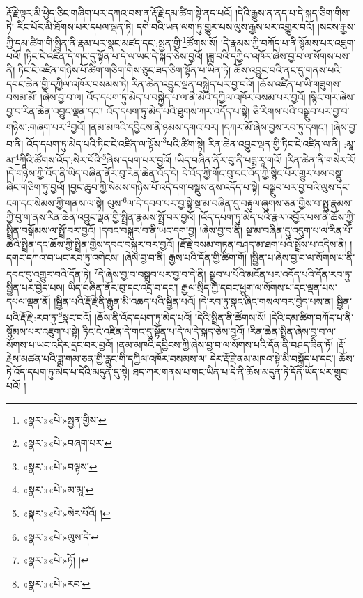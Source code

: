 རྡོ་རྗེ་ལྟར་མི་ཕྱེད་ཅིང་གཞིག་པར་དཀའ་བས་ན་རྡོ་རྗེ་དམ་ཚིག་སྟེ་ནད་པའོ། །དེའི་རྒྱུས་ན་ནད་པ་དེ་སྐད་ཅིག་གིས་ཏེ། རིང་པོར་མི་ཐོགས་པར་དཔལ་ལྡན་ཏེ། དགེ་བའི་ཡན་ལག་ཏུ་གྱུར་པས་ལུས་རྒྱས་པར་འགྱུར་བའོ། །སངས་རྒྱས་ཀྱི་དམ་ཚིག་གི་སྤྲིན་ནི་རྣམ་པར་སྣང་མཛད་དང་:སྤྱན་གྱི་\footnote{«སྣར་»«པེ་»སྤྱན་གྱིས་}ཚོགས་སོ། །དེ་རྣམས་ཀྱི་བཀོད་པ་ནི་སྙོམས་པར་འཇུག་པའོ། །ཏིང་ངེ་འཛིན་དེ་གང་དུ་སྟོན་པ་དེ་ལ་ཡང་དེ་སྐད་ཅེས་བྱའོ། །ཟླ་བའི་དཀྱིལ་འཁོར་ཞེས་བྱ་བ་ལ་སོགས་པས་ནི། ཏིང་ངེ་འཛིན་གཉིས་པོ་ཚིག་གཅིག་གིས་ཅུང་ཟད་ཅིག་སྟོན་པ་ཡིན་ཏེ། ཆོས་འབྱུང་བའི་ནང་དུ་གནས་པའི་དབང་ཆེན་གྱི་དཀྱིལ་འཁོར་བསམས་ཏེ། རིན་ཆེན་འབྱུང་ལྡན་བསྐྱེད་པར་བྱ་བའོ། །ཆོས་འཛིན་པ་ཡི་གཟུགས་བསམ་མོ། །ཞེས་བྱ་བ་ལ། འོད་དཔག་ཏུ་མེད་པ་བསྐྱེད་པ་ལ་ནི་མེའི་དཀྱིལ་འཁོར་བསམ་པར་བྱའོ། །སྙིང་གར་ཞེས་བྱ་བ་རིན་ཆེན་འབྱུང་ལྡན་དང་། འོད་དཔག་ཏུ་མེད་པའི་ཐུགས་ཀར་འདོད་པ་སྟེ། ཅི་རིགས་པའི་བསྒྲུབ་པར་བྱ་བ་གཉིས་:གཞག་པར་\footnote{«སྣར་»«པེ་»བཞག་པར་}བྱའོ། །ནམ་མཁའི་དབྱིངས་ནི་ཉམས་དགའ་བར། །དཀར་མོ་ཞེས་བྱས་རབ་ཏུ་དགང་། །ཞེས་བྱ་བ་ནི། འོད་དཔག་ཏུ་མེད་པའི་ཏིང་ངེ་འཛིན་ལ་ལྟོས་\footnote{«སྣར་»«པེ་»བལྟས་}པའི་ཚིག་སྟེ། རིན་ཆེན་འབྱུང་ལྡན་གྱི་ཏིང་ངེ་འཛིན་ལ་ནི། :མཱ་མ་\footnote{«སྣར་»«པེ་»མ་མཱ་}ཀཱིའི་ཚོགས་འོད་:སེར་པོའི་\footnote{«སྣར་»«པེ་»སེར་པོའོ། །}ཞེས་དཔག་པར་བྱའོ། །ཡིད་བཞིན་ནོར་བུ་ནི་པདྨ་རཱ་གའོ། །རིན་ཆེན་ནི་གསེར་རོ། །དེ་གཉིས་ཀྱི་འོད་ནི་ཡིད་བཞིན་ནོར་བུ་རིན་ཆེན་འོད་དེ། དེ་འོད་ཀྱི་གོང་བུ་དང་འོད་ཀྱི་སྙིང་པོར་གྱུར་པས་བསྡུ་ཞིང་གཅིག་ཏུ་བྱའོ། །བྱང་ཆུབ་ཀྱི་སེམས་གཉིས་པོ་འདི་དག་བསྡུས་ནས་འདོད་པ་སྟེ། བསྒྲུབ་པར་བྱ་བའི་ལུས་དང་ངག་དང་སེམས་ཀྱི་གནས་ལ་སྟེ། ལུས་\footnote{«སྣར་»«པེ་»ལུས་དེ་}ལ་དེ་དབབ་པར་བྱ་སྟེ་སྔ་མ་བཞིན་དུ་བརྟུལ་ཞུགས་ཅན་གྱིས་བ་སྤུ་རྣམས་ཀྱི་བུ་ག་ནས་རིན་ཆེན་འབྱུང་ལྡན་གྱི་སྤྲིན་རྣམས་སྤྲོ་བར་བྱའོ། །འོད་དཔག་ཏུ་མེད་པའི་རྣལ་འབྱོར་པས་ནི་ཆོས་ཀྱི་སྤྲིན་བསྒོམས་ལ་སྤྲོ་བར་བྱའོ། །དབང་བསྐུར་བ་ནི་ཡང་དག་བྱ། །ཞེས་བྱ་བ་ནི། སྔ་མ་བཞིན་དུ་འདུག་པ་ལ་རིན་པོ་ཆེའི་སྤྲིན་དང་ཆོས་ཀྱི་སྤྲིན་གྱིས་དབང་བསྐུར་བར་བྱའོ། །རྡོ་རྗེ་བསམ་གཏན་བཤད་མ་ཐག་པའི་སྤྲོས་པ་འདིས་ནི། །དགང་དཀའ་བ་ཡང་རབ་ཏུ་འགེངས། །ཞེས་བྱ་བ་ནི། རྒྱས་པའི་དོན་གྱི་ཚིག་གོ། །སྦྱིན་པ་ཞེས་བྱ་བ་ལ་སོགས་པ་ནི་དབང་དུ་འགྱུར་བའི་དོན་ཏེ། \footnote{«སྣར་»«པེ་»ཏོ། ། }དེ་ཞེས་བྱ་བ་བསྒྲུབ་པར་བྱ་བ་དེ་ནི། སྒྲུབ་པ་པོའི་མངོན་པར་འདོད་པའི་དོན་རབ་ཏུ་སྦྱིན་པར་བྱེད་པས། ཡིད་བཞིན་ནོར་བུ་དང་འདྲ་བ་དང་། རྒྱལ་སྲིད་ཀྱི་དབང་ཕྱུག་ལ་སོགས་པ་དང་ལྡན་པས་དཔལ་ལྡན་ནོ། །སྦྱིན་པའི་རྡོ་རྗེ་ནི་རྒྱུན་མི་འཆད་པའི་སྦྱིན་པའོ། །དེ་རབ་ཏུ་སྣང་ཞིང་གསལ་བར་བྱེད་པས་ན། སྦྱིན་པའི་རྡོ་རྗེ་:རབ་ཏུ་\footnote{«སྣར་»«པེ་»རབ་}སྣང་བའོ། །ཆོས་ནི་འོད་དཔག་ཏུ་མེད་པའོ། །དེའི་སྤྲིན་ནི་ཚོགས་སོ། །དེའི་དམ་ཚིག་བཀོད་པ་ནི་སྙོམས་པར་འཇུག་པ་སྟེ། ཏིང་ངེ་འཛིན་དེ་གང་དུ་སྟོན་པ་དེ་ལ་དེ་སྐད་ཅེས་བྱའོ། །རིན་ཆེན་སྤྲིན་ཞེས་བྱ་བ་ལ་སོགས་པ་ཡང་འདིར་དྲང་བར་བྱའོ། །ནམ་མཁའི་དབྱིངས་ཀྱི་ཞེས་བྱ་བ་ལ་སོགས་པའི་དོན་ནི་བཤད་ཟིན་ཏོ། །རྡོ་རྗེས་མཚན་པའི་ཟླ་གམ་ཅན་གྱི་རླུང་གི་དཀྱིལ་འཁོར་བསམས་ལ། དེར་རྡོ་རྗེ་ནམ་མཁའ་སྟེ་མི་བསྐྱོད་པ་དང་། ཆོས་ཏེ་འོད་དཔག་ཏུ་མེད་པ་དེའི་མདུན་དུ་སྟེ། ཐད་ཀར་གནས་པ་གང་ཡིན་པ་དེ་ནི་ཆོས་མདུན་ཏེ་དོན་ཡོད་པར་གྲུབ་པའོ། །
